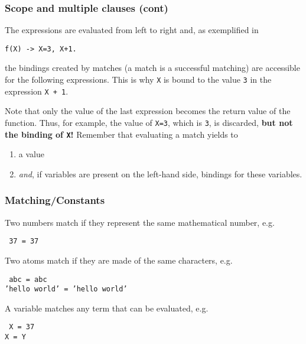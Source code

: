 %
\begin{frame}[containsverbatim]
\frametitle{Scope and multiple clauses (cont)}

The expressions are evaluated from left to right and, as exemplified
in
\begin{verbatim}
f(X) -> X=3, X+1.
\end{verbatim}
the bindings created by matches (a match is a successful matching) are
accessible for the following expressions. This is why \texttt{X} is
bound to the value \texttt{3} in the expression \texttt{X + 1}.

\bigskip

Note that only the value of the last expression becomes the return
value of the function. Thus, for example, the value of \texttt{X=3},
which is \texttt{3}, is discarded, \textbf{but not the binding of
  \texttt{X}!} Remember that evaluating a match yields to
\begin{enumerate}

  \item a value

  \item \emph{and}, if variables are present on the left-hand side,
    bindings for these variables.

\end{enumerate}

\end{frame}

%
\begin{frame}
\frametitle{Matching/Constants}

Two numbers match if they represent the same mathematical number, e.g.
\begin{center}
\tt
37 = 37
\end{center}
Two atoms match if they are made of the same characters, e.g.
\begin{center}
\tt
abc = abc\\
'hello world' = 'hello world'
\end{center}
A variable matches any term that can be evaluated, e.g.
\begin{center}
\tt
X = 37\\
X = Y
\end{center}

\end{frame}


